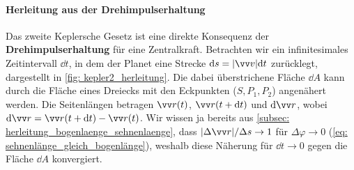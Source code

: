 \paragraph{Herleitung aus der Drehimpulserhaltung}
Das zweite Keplersche Gesetz ist eine direkte Konsequenz der \textbf{Drehimpulserhaltung} für eine Zentralkraft. Betrachten wir ein infinitesimales Zeitintervall $\dd t$, in dem der Planet eine Strecke $\dd s = |\ivec{v}| \dd t$ zurücklegt, dargestellt in \cref{fig: kepler2_herleitung}. Die dabei überstrichene Fläche $\dd A$ kann durch die Fläche eines Dreiecks mit den Eckpunkten ($S, P_1, P_2$) angenähert werden. Die Seitenlängen betragen $\ivec{r}(t)$, $\ivec{r}(t+\dd t)$ und $\dd\ivec{r}$, wobei $\dd \ivec{r} = \ivec{r}(t+\dd t) - \ivec{r}(t)$. Wir wissen ja bereits aus \cref{subsec: herleitung_bogenlaenge_sehnenlaenge}, dass $|\Delta \ivec{r}|/\Delta s \to 1$ für $\Delta \varphi \to 0$ (\cref{eq: sehnenlänge_gleich_bogenlänge}), weshalb diese Näherung für $\dd t \to 0$ gegen die Fläche $\dd A$ konvergiert.
